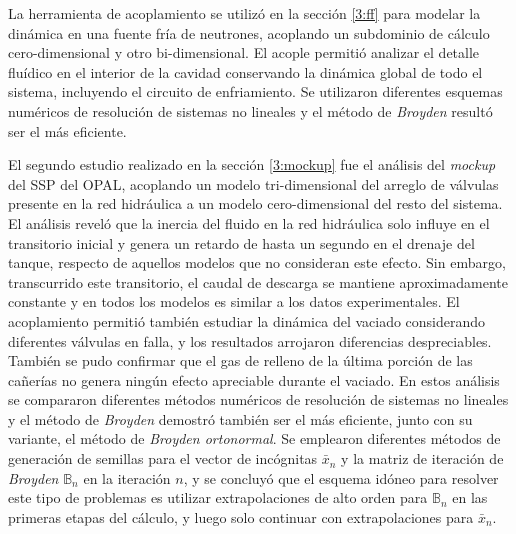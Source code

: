 La herramienta de acoplamiento se utilizó en la sección \ref{3:ff} para modelar la dinámica en una fuente fría de neutrones,
acoplando un subdominio de cálculo cero-dimensional y otro bi-dimensional.
El acople permitió analizar el detalle fluídico en el interior de la cavidad conservando la dinámica global de todo el sistema, incluyendo el circuito de enfriamiento.
Se utilizaron diferentes esquemas numéricos de resolución de sistemas no lineales y el método de \textit{Broyden} resultó ser el más eficiente.

El segundo estudio realizado en la sección \ref{3:mockup} fue el análisis del \textit{mockup} del SSP del OPAL,
acoplando un modelo tri-dimensional del arreglo de válvulas presente en la red hidráulica a un modelo cero-dimensional del resto del sistema.
El análisis reveló que la inercia del fluido en la red hidráulica solo influye en el transitorio inicial y
genera un retardo de hasta un segundo en el drenaje del tanque,
respecto de aquellos modelos que no consideran este efecto.
Sin embargo, transcurrido este transitorio, el caudal de descarga se mantiene aproximadamente constante y en todos los modelos es similar a los datos experimentales.
El acoplamiento permitió también estudiar la dinámica del vaciado considerando diferentes válvulas en falla, y los resultados arrojaron diferencias despreciables.
También se pudo confirmar que el gas de relleno de la última porción de las cañerías no genera ningún efecto apreciable durante el vaciado.
En estos análisis se compararon diferentes métodos numéricos de resolución de sistemas no lineales y el método de \textit{Broyden} demostró también ser el más eficiente,
junto con su variante, el método de \textit{Broyden ortonormal}.
Se emplearon diferentes métodos de generación de semillas para el vector de incógnitas $\bar{x}_n$ y la matriz de iteración de \textit{Broyden} $\mathbb{B}_n$ en la iteración $n$,
y se concluyó que el esquema idóneo para resolver este tipo de problemas es utilizar extrapolaciones de alto orden para $\mathbb{B}_n$ en las primeras etapas del cálculo,
y luego solo continuar con extrapolaciones para $\bar{x}_n$.

